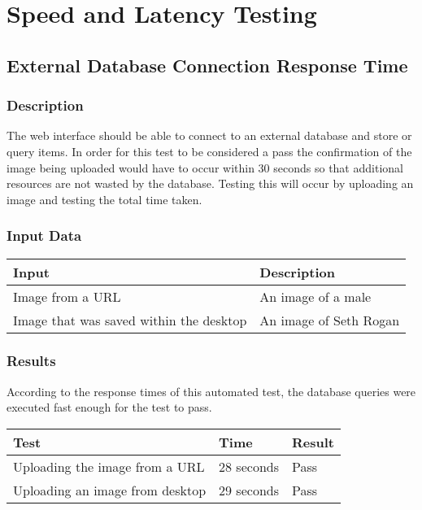 \documentclass{scrreprt}
\begin{document}
\section{Speed and Latency Testing}

\subsection{External Database Connection Response Time}
\subsubsection{Description}

The web interface should be able to connect to an external database and store
or query items. In order for this test to be considered a pass the confirmation
of the image being uploaded would have to occur within 30 seconds so that
additional resources are not wasted by the database. Testing this will occur by
uploading an image and testing the total time taken.

\subsubsection{Input Data}

\begin{table}[H]
        \centering
        \begin{tabular}{p{3cm}p{6cm}}
                \hline\hline
                Input & Description\\
                \hline\hline
                Image from a URL & An image of a male  \\
                \hline\hline
                Image that was saved within the desktop & An image of Seth Rogan \\
                \hline
        \end{tabular}
\end{table}

\subsubsection{Results}

According to the response times of this automated test, the database queries
were executed fast enough for the test to pass.

\begin{table}
        \centering
        \begin{tabular}{||p{1.5cm}|p{1.5cm}|p{1.5cm}||}
                \hline
                \textbf Test & \textbf Time & \textbf Result \\
                \hline\hline
                Uploading the image from a URL & 28 seconds  & Pass\\
                \hline\hline
                Uploading an image from desktop & 29 seconds & Pass\\
                \hline
        \end{tabular}
\end{table}
\vspace{1cm}
\end{document}
